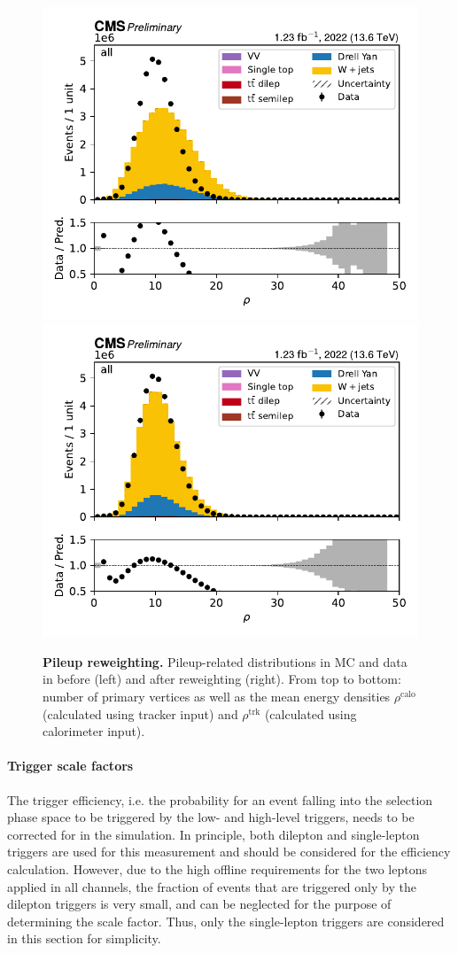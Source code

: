 \begin{figure}[p]
    \includegraphics[width=0.49 \textwidth]{figures/ttxs/pileup/rhoFastjetCentralCalo_orig.pdf}
    \hfill
    \includegraphics[width=0.49 \textwidth]{figures/ttxs/pileup/rhoFastjetCentralCalo_reweighted.pdf}
    \caption{\textbf{Pileup reweighting.} Pileup-related distributions in MC and data in before (left) and after reweighting (right). From top to bottom: number of primary vertices as well as the mean energy densities $\rho^{\mathrm{calo}}$ (calculated using tracker input) and $\rho^{\mathrm{trk}}$ (calculated using calorimeter input). }
    \label{fig:ttxs:pileup}
  \end{figure}

\paragraph{Trigger scale factors}

The trigger efficiency, i.e. the probability for an event falling into the selection phase space to be triggered by the low- and high-level triggers, needs to be corrected for in the simulation.
In principle, both dilepton and single-lepton triggers are used for this measurement and should be considered for the efficiency calculation. However, due to the high offline \pt requirements for the two leptons applied in all channels, the fraction of events that are triggered only by the dilepton triggers is very small, and can be neglected for the purpose of determining the scale factor. Thus, only the single-lepton triggers are considered in this section for simplicity.

